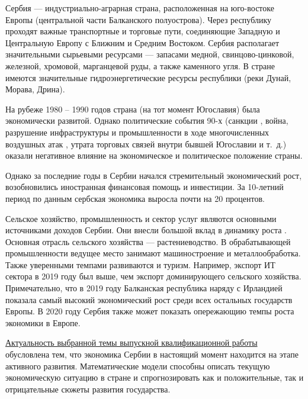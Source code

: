 \intro

Сербия --- индустриально-аграрная страна, расположенная на юго-востоке Европы (центральной части Балканского полуострова).
Через республику проходят важные транспортные и торговые пути, соединяющие Западную и Центральную Европу с Ближним и Средним Востоком.
Сербия располагает значительными сырьевыми ресурсами --- запасами медной, свинцово-цинковой, железной, хромовой, марганцевой руды, а также каменного угля.
В стране имеются значительные гидроэнергетические ресурсы республики (реки Дунай, Морава, Дрина).

На рубеже 1980 -- 1990 годов страна (на тот момент Югославия) была экономически развитой.
Однако политические события 90-х (санкции , война, разрушение инфраструктуры и промышленности в ходе многочисленных воздушных атак , утрата торговых связей внутри бывшей Югославии и т.~д.) оказали негативное влияние на экономическое и политическое положение страны.

Однако за последние годы в Сербии начался стремительный экономический рост, возобновились иностранная финансовая помощь и инвестиции.
За 10-летний период по данным  сербская экономика выросла почти на 20 процентов.

Сельское хозяйство, промышленность и сектор услуг являются основными источниками доходов Сербии.
Они внесли большой вклад в динамику роста .
Основная отрасль сельского хозяйства --- растениеводство.
В обрабатывающей промышленности ведущее место занимают машиностроение и металлообработка.
Также уверенными темпами развиваются  и туризм.
Например, экспорт ИТ сектора в 2019 году был выше, чем экспорт доминирующего сельского хозяйства.
Примечательно, что в 2019 году Балканская республика наряду с Ирландией показала самый высокий экономический рост среди всех остальных государств Европы.
В 2020 году Сербия также может показать опережающию темпы роста экономики в Европе.

\underline{Актуальность выбранной темы выпускной квалификационной работы } обусловлена тем, что экономика Сербии в настоящий момент находится на этапе активного развития.
Математические модели способны описать текущую экономическую ситуацию в стране и спрогнозировать как и положительные, так и отрицательные сюжеты развития государства.

